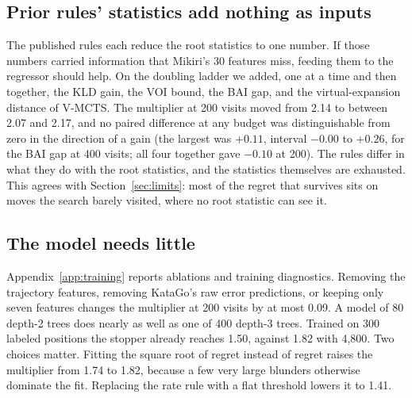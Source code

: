 \subsection{Prior rules' statistics add nothing as inputs}
\label{sec:hybrid}

The published rules each reduce the root statistics to one number. If those numbers carried information that Mikiri's 30 features miss, feeding them to the regressor should help. On the doubling ladder we added, one at a time and then together, the KLD gain, the VOI bound, the BAI gap, and the virtual-expansion distance of V-MCTS. The multiplier at 200 visits moved from 2.14 to between 2.07 and 2.17, and no paired difference at any budget was distinguishable from zero in the direction of a gain (the largest was $+0.11$, interval $-0.00$ to $+0.26$, for the BAI gap at 400 visits; all four together gave $-0.10$ at 200). The rules differ in what they do with the root statistics, and the statistics themselves are exhausted. This agrees with Section~\ref{sec:limits}: most of the regret that survives sits on moves the search barely visited, where no root statistic can see it.

\subsection{The model needs little}

Appendix~\ref{app:training} reports ablations and training diagnostics. Removing the trajectory features, removing KataGo's raw error predictions, or keeping only seven features changes the multiplier at 200 visits by at most 0.09. A model of 80 depth-2 trees does nearly as well as one of 400 depth-3 trees. Trained on 300 labeled positions the stopper already reaches 1.50, against 1.82 with 4{,}800. Two choices matter. Fitting the square root of regret instead of regret raises the multiplier from 1.74 to 1.82, because a few very large blunders otherwise dominate the fit. Replacing the rate rule with a flat threshold lowers it to 1.41.
